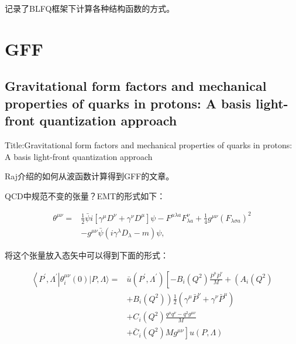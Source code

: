 \documentclass{article}
\begin{document}
记录了BLFQ框架下计算各种结构函数的方式。





\section{GFF}

\subsection{Gravitational form factors and mechanical properties of quarks in protons: A basis light-front quantization approach}

Title:Gravitational form factors and mechanical properties of quarks in protons:
A basis light-front quantization approach \cite{nair2024gravitationalformfactorsmechanical}

Raj介绍的如何从波函数计算得到GFF的文章。

QCD中规范不变的张量？EMT的形式如下：

\begin{equation}
    \begin{aligned}
    \theta^{\mu \nu}= & \frac{1}{2} \bar{\psi} i\left[\gamma^\mu D^\nu+\gamma^\nu D^\mu\right] \psi-F^{\mu \lambda a} F_{\lambda a}^\nu+\frac{1}{4} g^{\mu \nu}\left(F_{\lambda \sigma a}\right)^2 \\
    & -g^{\mu \nu} \bar{\psi}\left(i \gamma^\lambda D_\lambda-m\right) \psi,
    \end{aligned}
\end{equation}


将这个张量放入态矢中可以得到下面的形式：

\begin{equation}
    \begin{aligned}
    \left\langle P^{\prime}, \Lambda^{\prime}\right| \theta_i^{\mu \nu}(0)|P, \Lambda\rangle= & \bar{u}\left(P^{\prime}, \Lambda^{\prime}\right)\left[-B_i\left(Q^2\right) \frac{\bar{P}^\mu \bar{P}^\nu}{M}+\left(A_i\left(Q^2\right)\right.\right. \\
    & \left.+B_i\left(Q^2\right)\right) \frac{1}{2}\left(\gamma^\mu \bar{P}^\nu+\gamma^\nu \bar{P}^\mu\right) \\
    & +C_i\left(Q^2\right) \frac{q^\mu q^\nu-q^2 g^{\mu \nu}}{M} \\
    & \left.+\bar{C}_i\left(Q^2\right) M g^{\mu \nu}\right] u(P, \Lambda)
    \end{aligned}
\end{equation}
\end{document}
